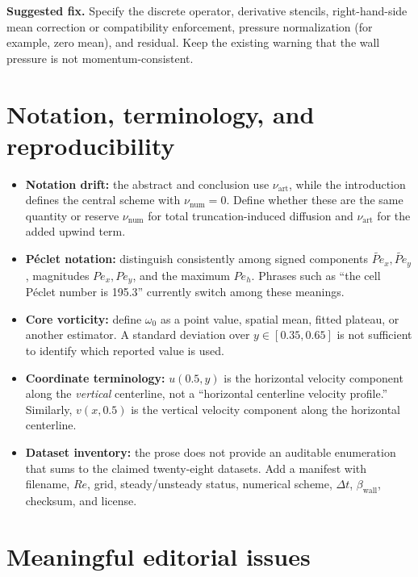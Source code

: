 \documentclass[11pt]{article}
\newcommand{\Rey}{\mathit{Re}}
\begin{document}
\textbf{Suggested fix.} Specify the discrete operator, derivative stencils, right-hand-side mean correction or compatibility enforcement, pressure normalization (for example, zero mean), and residual. Keep the existing warning that the wall pressure is not momentum-consistent.

\section*{Notation, terminology, and reproducibility}

\begin{itemize}
    \item \textbf{Notation drift:} the abstract and conclusion use $\nu_{\mathrm{art}}$, while the introduction defines the central scheme with $\nu_{\mathrm{num}}=0$. Define whether these are the same quantity or reserve $\nu_{\mathrm{num}}$ for total truncation-induced diffusion and $\nu_{\mathrm{art}}$ for the added upwind term.
    \item \textbf{P\'eclet notation:} distinguish consistently among signed components $\widetilde{Pe}_x,\widetilde{Pe}_y$, magnitudes $Pe_x,Pe_y$, and the maximum $Pe_h$. Phrases such as ``the cell P\'eclet number is 195.3'' currently switch among these meanings.
    \item \textbf{Core vorticity:} define $\omega_0$ as a point value, spatial mean, fitted plateau, or another estimator. A standard deviation over $y\in[0.35,0.65]$ is not sufficient to identify which reported value is used.
    \item \textbf{Coordinate terminology:} $u(0.5,y)$ is the horizontal velocity component along the \emph{vertical} centerline, not a ``horizontal centerline velocity profile.'' Similarly, $v(x,0.5)$ is the vertical velocity component along the horizontal centerline.
    \item \textbf{Dataset inventory:} the prose does not provide an auditable enumeration that sums to the claimed twenty-eight datasets. Add a manifest with filename, $\Rey$, grid, steady/unsteady status, numerical scheme, $\Delta t$, $\beta_{\mathrm{wall}}$, checksum, and license.
\end{itemize}

\section*{Meaningful editorial issues}
\end{document}
